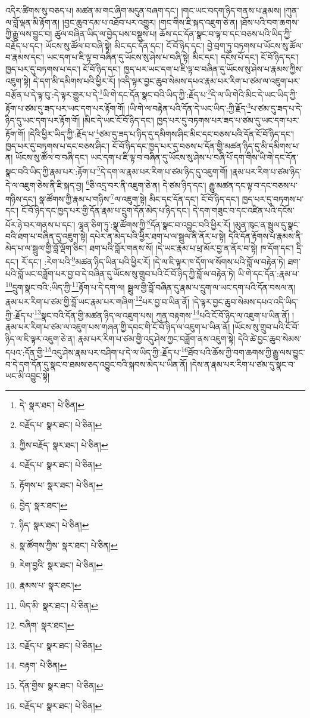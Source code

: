 འདིར་ཚིགས་སུ་བཅད་པ། མཚན་མ་གང་ཞིག་མདུན་བཞག་དང་། །གང་ཡང་བདག་ཉིད་གནས་པ་རྣམས། །ཀུན་ལ་བློ་ལྡན་མི་རྟོག་ན། །བྱང་ཆུབ་དམ་པ་འཐོབ་པར་འགྱུར། །གང་གིས་ཇི་སྐད་འཇུག་ཅེ་ན། །ཐོས་པའི་བག་ཆགས་ཀྱི་རྒྱུ་ལས་བྱུང་བ། ཚུལ་བཞིན་ཡིད་ལ་བྱེད་པས་བསྡུས་པ། ཆོས་དང་དོན་སྣང་བ་ལྟ་བ་དང་བཅས་པའི་ཡིད་ཀྱི་བརྗོད་པ་དང་། ཡོངས་སུ་ཚོལ་བ་བཞི་སྟེ། མིང་དང་དོན་དང་། ངོ་བོ་ཉིད་དང་། བྱེ་བྲག་ཏུ་བཏགས་པ་ཡོངས་སུ་ཚོལ་བ་རྣམས་དང་། ཡང་དག་པ་ཇི་ལྟ་བ་བཞིན་དུ་ཡོངས་སུ་ཤེས་པ་བཞི་སྟེ། མིང་དང་། དངོས་པོ་དང་། ངོ་བོ་ཉིད་དང་། ཁྱད་པར་དུ་བཏགས་པ་དང་། ངོ་བོ་ཉིད་དང་། ཁྱད་པར་ཡང་དག་པ་ཇི་ལྟ་བ་བཞིན་དུ་ཡོངས་སུ་ཤེས་པ་རྣམས་ཀྱིས་འཇུག་སྟེ། དེ་དག་མི་དམིགས་པའི་ཕྱིར་རོ། །འདི་ལྟར་བྱང་ཆུབ་སེམས་དཔའ་རྣམ་པར་རིག་པ་ཙམ་ལ་འཇུག་པར་བརྩོན་པ་དེ་ལྟ་བུ་:དེ་ལྟར་གྱུར་པ་དེ་\footnote{དེ་  སྣར་ཐང་།  པེ་ཅིན། }ཡི་གེ་དང་དོན་སྣང་བའི་ཡིད་ཀྱི་:རྗོད་པ་\footnote{བརྗོད་པ་  སྣར་ཐང་།  པེ་ཅིན། }དེ་ལ་ཡི་གེའི་མིང་དེ་ཡང་ཡིད་ཀྱི་རྟོག་པ་ཙམ་དུ་ཟད་པར་ཡང་དག་པར་རྟོག་གོ། །ཡི་གེ་ལ་བརྟེན་པའི་དོན་དེ་ཡང་ཡིད་:ཀྱི་རྗོད་\footnote{ཀྱིས་བརྗོད་  སྣར་ཐང་།  པེ་ཅིན། }པ་ཙམ་དུ་ཟད་པ་དེ་ཉིད་དུ་ཡང་དག་པར་རྟོག་གོ། །མིང་དེ་ཡང་ངོ་བོ་ཉིད་དང་། ཁྱད་པར་དུ་བཏགས་པར་ཟད་པ་ཙམ་དུ་ཡང་དག་པར་རྟོག་གོ། །དེའི་ཕྱིར་ཡིད་ཀྱི་:རྗོད་པ་\footnote{བརྗོད་པ་  སྣར་ཐང་།  པེ་ཅིན། }ཙམ་དུ་ཟད་པ་ཉིད་དུ་དམིགས་ཤིང་མིང་དང་བཅས་པའི་དོན་ངོ་བོ་ཉིད་དང་། ཁྱད་པར་དུ་བཏགས་པ་དང་བཅས་ཤིང་། ངོ་བོ་ཉིད་དང་ཁྱད་པར་དུ་བཅས་པ་དོན་གྱི་མཚན་ཉིད་དུ་མི་དམིགས་པ་ན། ཡོངས་སུ་ཚོལ་བ་བཞི་དང་། ཡང་དག་པ་ཇི་ལྟ་བ་བཞིན་དུ་ཡོངས་སུ་ཤེས་པ་བཞི་པོ་དག་གིས་ཡི་གེ་དང་དོན་སྣང་བའི་ཡིད་ཀྱི་རྣམ་པར་:རྟོག་པ་\footnote{རྟོགས་པ་  སྣར་ཐང་།  པེ་ཅིན། }དེ་དག་ལ་རྣམ་པར་རིག་པ་ཙམ་ཉིད་དུ་འཇུག་གོ། །རྣམ་པར་རིག་པ་ཙམ་ཉིད་དེ་ལ་འཇུག་ཅེས་ནི་ཇི་སྐད་བྱ། \footnote{བྱེད་  སྣར་ཐང་། }ཅི་འདྲ་བར་ནི་འཇུག་ཅེ་ན། དེ་ཙམ་ཉིད་དང་། རྒྱུ་མཚན་དང་ལྟ་བ་དང་བཅས་པ་གཉིས་དང་། སྣ་ཚོགས་ཀྱི་རྣམ་པ་གཉིས་\footnote{ཉིད་  སྣར་ཐང་།  པེ་ཅིན། }ལ་འཇུག་སྟེ། མིང་དང་དོན་དང་། ངོ་བོ་ཉིད་དང་། ཁྱད་པར་དུ་བཏགས་པ་དང་། ངོ་བོ་ཉིད་དང་ཁྱད་པར་གྱི་དོན་རྣམ་པ་དྲུག་དོན་མེད་པ་ཉིད་དང་། དེ་དག་གཟུང་བ་དང་འཛིན་པའི་དངོས་པོར་ཉེ་བར་གནས་པ་དང་། ལྷན་ཅིག་ཏུ་:སྣ་ཚོགས་ཀྱི་\footnote{སྣ་ཚོགས་ཀྱིས་  སྣར་ཐང་།  པེ་ཅིན། }དོན་སྣང་བ་འབྱུང་བའི་ཕྱིར་རོ། །མུན་ཁུང་ན་སྦྲུལ་དུ་སྣང་བའི་ཐག་པ་བཞིན་དུ་འཇུག་སྟེ། དཔེར་ན་མེད་པའི་ཕྱིར་ཐག་པ་ལ་སྦྲུལ་ནི་ནོར་པ་སྟེ། དེའི་དོན་རྟོགས་པ་རྣམས་ནི་མེད་པ་ལ་སྦྲུལ་གྱི་བློ་ལྡོག་ཅིང་། ཐག་པའི་བློར་གནས་སོ། །དེ་ཡང་རྣམ་པ་ཕྲ་མོར་བྱ་ན་ནོར་བ་སྟེ། ཁ་དོག་དང་། དྲི་དང་། རོ་དང་། :རེག་པའི་\footnote{རེག་བྱའི་  སྣར་ཐང་།  པེ་ཅིན། }མཚན་ཉིད་ཡིན་པའི་ཕྱིར་རོ། །དེ་ལ་ཇི་ལྟར་ཁ་དོག་ལ་སོགས་པའི་བློ་ལ་བརྟེན་ཏེ། ཐག་པའི་བློ་ཡང་བཟློག་པར་བྱ་བ་དེ་བཞིན་དུ་ཡོངས་སུ་གྲུབ་པའི་ངོ་བོ་ཉིད་ཀྱི་བློ་ལ་བརྟེན་ཏེ། ཡི་གེ་དང་དོན་:རྣམ་པ་\footnote{རྣམས་པ་  སྣར་ཐང་། }དྲུག་སྣང་བའི་:ཡིད་ཀྱི་\footnote{ཡིད་མི་  སྣར་ཐང་།  པེ་ཅིན། }རྟོག་པ་དེ་དག་ལ། སྦྲུལ་གྱི་བློ་བཞིན་དུ་རྣམ་པ་དྲུག་ལ་ཡང་དག་པའི་དོན་བསལ་ན། རྣམ་པར་རིག་པ་ཙམ་གྱི་བློ་ཡང་རྣམ་པར་གཞིག་\footnote{བཞིག་  སྣར་ཐང་། }པར་བྱ་བ་ཡིན་ནོ། །དེ་ལྟར་བྱང་ཆུབ་སེམས་དཔའ་འདི་ཡིད་ཀྱི་:རྗོད་པ་\footnote{བརྗོད་པ་  སྣར་ཐང་།  པེ་ཅིན། }སྣང་བའི་དོན་གྱི་མཚན་ཉིད་ལ་འཇུག་པས། ཀུན་བརྟགས་\footnote{བརྟག་  པེ་ཅིན། }པའི་ངོ་བོ་ཉིད་ལ་འཇུག་པ་ཡིན་ནོ། །རྣམ་པར་རིག་པ་ཙམ་ལ་འཇུག་པས་གཞན་གྱི་དབང་གི་ངོ་བོ་ཉིད་ལ་འཇུག་པ་ཡིན་ནོ། །ཡོངས་སུ་གྲུབ་པའི་ངོ་བོ་ཉིད་ལ་ཇི་ལྟར་འཇུག་ཅེ་ན། རྣམ་པར་རིག་པ་ཙམ་གྱི་འདུ་ཤེས་ཀྱང་བཟློག་ནས་འཇུག་སྟེ། དེའི་ཚེ་བྱང་ཆུབ་སེམས་དཔའ་:དོན་གྱི་\footnote{དོན་གྱིས་  སྣར་ཐང་།  པེ་ཅིན། }འདུ་ཤེས་རྣམ་པར་བཤིག་པ་དེ་ལ་ཡིད་ཀྱི་:རྗོད་པ་\footnote{བརྗོད་པ་  སྣར་ཐང་།  པེ་ཅིན། }ཐོབ་པའི་ཆོས་ཀྱི་བག་ཆགས་ཀྱི་རྒྱུ་ལས་བྱུང་བ་དེ་དག་དོན་དུ་སྣང་བ་ཐམས་ཅད་འབྱུང་བའི་སྐབས་མེད་པ་ཡིན་ནོ། །དེས་ན་རྣམ་པར་རིག་པ་ཙམ་དུ་སྣང་བ་ཡང་མི་འབྱུང་སྟེ། 